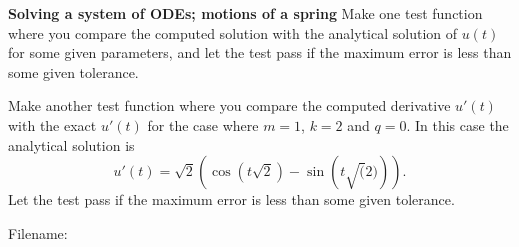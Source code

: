 \begin{Problem}{\textbf{Solving a system of ODEs; motions of a spring}}
Make one test function where you compare the computed solution with the analytical solution of $u(t)$ for some given parameters, and let the test pass if the maximum error is less than some given tolerance.

Make another test function where you compare the computed derivative $u'(t)$ with the exact $u'(t)$ for the case where $m=1$, $k=2$ and $q=0$. In this case the analytical solution is
\begin{equation*}
u'(t)= \sqrt{2}\left(\cos\left(t\sqrt{2}\right) - \sin\left(t\sqrt(2) \right)\right).
\end{equation*}
Let the test pass if the maximum error is less than some given tolerance.

Filename: 
\end{Problem}

